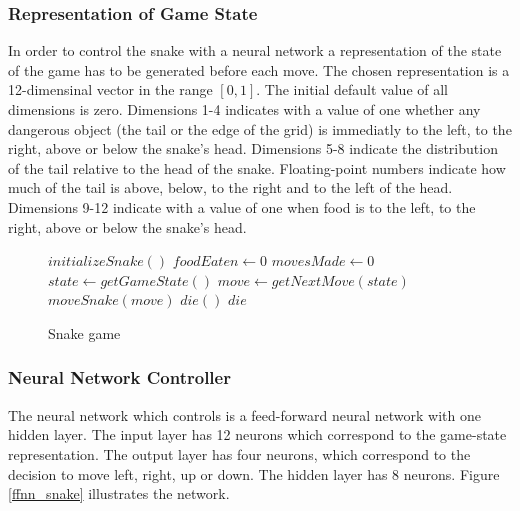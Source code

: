 \subsubsection{Representation of Game State}

In order to control the snake with a neural network a representation of the state of the game has to be generated before each move. The chosen representation is a 12-dimensinal vector in the range $[0,1]$. The initial default value of all dimensions is zero. Dimensions 1-4 indicates with a value of one whether any dangerous object (the tail or the edge of the grid) is immediatly to the left, to the right, above or below the snake's head. Dimensions 5-8 indicate the distribution of the tail relative to the head of the snake. Floating-point numbers indicate how much of the tail is above, below, to the right and to the left of the head. Dimensions 9-12 indicate with a value of one when food is to the left, to the right, above or below the snake's head.

\begin{figure}[h]
  \centering
  \begin{minipage}{12.5cm}
    \begin{algorithmic}
      \State $initializeSnake()$
      \State $foodEaten \gets 0$
      \State $movesMade \gets 0$
        \State $state \gets getGameState()$
        \State $move \gets getNextMove(state)$
        \State $moveSnake(move)$
         $die()$
        \EndIf
         $die$
        \EndIf
        \EndIf
      \EndWhile

    \end{algorithmic}
  \end{minipage}
  \caption{Snake game}
  \label{snake_alg}
\end{figure}

\subsubsection{Neural Network Controller}

The neural network which controls is a feed-forward neural network with one hidden layer. The input layer has 12 neurons which correspond to the game-state representation. The output layer has four neurons, which correspond to the decision to move left, right, up or down. The hidden layer has 8 neurons. Figure \ref{ffnn_snake} illustrates the network.





